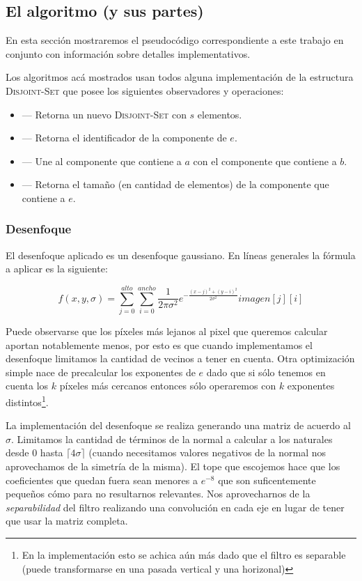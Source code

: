 \subsection{El algoritmo (y sus partes)}

En esta sección mostraremos el pseudocódigo correspondiente a este trabajo en
conjunto con información sobre detalles implementativos.

Los algoritmos acá mostrados usan todos alguna implementación de la estructura
\textsc{Disjoint-Set} que posee los siguientes observadores y operaciones:

\begin{itemize}
	\item {}
		--- Retorna un nuevo \textsc{Disjoint-Set} con $s$ elementos.
	\item {}
		--- Retorna el identificador de la componente de $e$.
	\item {}
		--- Une al componente que contiene a $a$ con el componente que
		contiene a $b$.
	\item {}
		--- Retorna el tamaño (en cantidad de elementos) de la
		componente que contiene a $e$.
\end{itemize}

\subsubsection{Desenfoque}

El desenfoque aplicado es un desenfoque gaussiano. En líneas generales la
fórmula a aplicar es la siguiente:

\[
	f(x,y,\sigma) =
		\sum_{j=0}^{alto} \! \sum_{i=0}^{ancho} \!
			\frac{1}{2\pi\sigma^2}
			e^{-\frac{{(x - j)}^2 + {(y - i)}^2}{2\sigma^2}}
			\textit{imagen}[j][i]
\]

Puede observarse que los píxeles más lejanos al pixel que queremos calcular
aportan notablemente menos, por esto es que cuando implementamos el desenfoque
limitamos la cantidad de vecinos a tener en cuenta. Otra optimización simple
nace de precalcular los exponentes de $e$ dado que si sólo tenemos en cuenta
los $k$ píxeles más cercanos entonces sólo operaremos con $k$ exponentes
distintos\footnote{En la implementación esto se achica aún más dado que el
filtro es separable (puede transformarse en una pasada vertical y una
horizonal)}.

La implementación del desenfoque se realiza generando una matriz de acuerdo al
$\sigma$. Limitamos la cantidad de términos de la normal a calcular a los
naturales desde $0$ hasta $\lceil 4 \sigma \rceil$ (cuando necesitamos valores
negativos de la normal nos aprovechamos de la simetría de la misma). El tope
que escojemos hace que los coeficientes que quedan fuera sean menores a
$e^{-8}$ que son suficentemente pequeños cómo para no resultarnos relevantes.
Nos aprovecharnos de la \emph{separabilidad} del filtro realizando una
convolución en cada eje en lugar de tener que usar la matriz completa.

